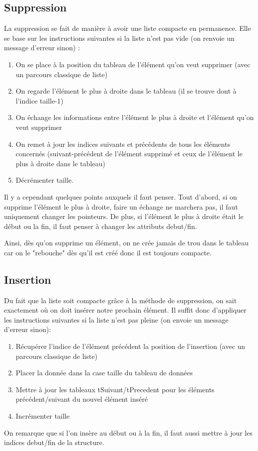 \documentclass{report}
\begin{document}
      \subsection{Suppression}
        La suppression se fait de manière à avoir une liste compacte en permanence. Elle se base sur les instructions suivantes si la liste n'est pas vide (on renvoie un message d'erreur sinon) :
        \begin{enumerate}
          \item On se place à la position du tableau de l'élément qu'on veut supprimer (avec un parcours classique de liste)
          \item On regarde l'élément le plus à droite dans le tableau (il se trouve dont à l'indice taille-1)
          \item On échange les informations entre l'élément le plus à droite et l'élément qu'on veut supprimer
          \item On remet à jour les indices suivants et précédents de tous les éléments concernés (suivant-précédent de l'élément supprimé et ceux de l'élément le plus à droite dans le tableau)
          \item Décrémenter taille.
        \end{enumerate}
        Il y a cependant quelques points auxquels il faut penser.
        Tout d'abord, si on supprime l'élément le plus à droite, faire un échange ne marchera pas, il faut uniquement changer les pointeurs. De plus, si l'élément le plus à droite était le début ou la fin, il faut penser à changer les attributs debut/fin.
        
        Ainsi, dès qu'on supprime un élément, on ne crée jamais de trou dans le tableau car on le "rebouche" dès qu'il est créé donc il est toujours compacte.
      \subsection{Insertion}
        Du fait que la liste soit compacte grâce à la méthode de suppression, on sait exactement où on doit insérer notre prochain élément. Il suffit donc d'appliquer les instructions suivantes si la liste n'est pas pleine (on envoie un message d'erreur sinon): 
        \begin{enumerate}
          \item Récupérer l'indice de l'élément précédent la position de l'insertion (avec un parcours classique de liste)
          \item Placer la donnée dans la case taille du tableau de données
          \item Mettre à jour les tableaux tSuivant/tPrecedent pour les éléments précédent/suivant du nouvel élément inséré
          \item Incrémenter taille
        \end{enumerate}
        On remarque que si l'on insère au début ou à la fin, il faut aussi mettre à jour les indices debut/fin de la structure.
\end{document}
